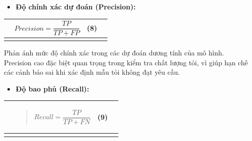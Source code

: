 \documentclass[
]{article}
\newcounter{none} %
\begin{document}
\begin{itemize}
\item
  \textbf{Độ chính xác dự đoán (Precision):}
\end{itemize}

{\def\LTcaptype{none} %
\begin{longtable}[]{@{}
  >{\raggedright\arraybackslash}p{}
  >{\raggedright\arraybackslash}p{}
  >{\raggedright\arraybackslash}p{}
  >{\raggedright\arraybackslash}p{}@{}}
\toprule\noalign{}
\begin{minipage}[b]{\linewidth}\raggedright
\end{minipage} & \begin{minipage}[b]{\linewidth}\centering
\[Precision = \frac{TP}{TP + FP}\]
\end{minipage} & \begin{minipage}[b]{\linewidth}\raggedright
(8)
\end{minipage} & \begin{minipage}[b]{\linewidth}\raggedright
\end{minipage} \\
\midrule\noalign{}
\endhead
\bottomrule\noalign{}
\endlastfoot
\end{longtable}
}

Phản ánh mức độ chính xác trong các dự đoán dương tính của mô hình.
Precision cao đặc biệt quan trọng trong kiểm tra chất lượng tỏi, vì giúp
hạn chế các cảnh báo sai khi xác định mẫu tỏi không đạt yêu cầu.

\begin{itemize}
\item
  \textbf{Độ bao phủ (Recall):}
\end{itemize}

{\def\LTcaptype{none} %
\begin{longtable}[]{@{}
  >{\raggedright\arraybackslash}p{}
  >{\raggedright\arraybackslash}p{}
  >{\raggedright\arraybackslash}p{}
  >{\raggedright\arraybackslash}p{}@{}}
\toprule\noalign{}
\begin{minipage}[b]{\linewidth}\raggedright
\end{minipage} & \begin{minipage}[b]{\linewidth}\raggedright
\begin{quote}
\[Recall = \frac{TP}{TP + FN}\]
\end{quote}
\end{minipage} & \begin{minipage}[b]{\linewidth}\raggedright
(9)
\end{minipage} & \begin{minipage}[b]{\linewidth}\raggedright
\end{minipage} \\
\midrule\noalign{}
\endhead
\bottomrule\noalign{}
\endlastfoot
\end{longtable}
}
\end{document}
